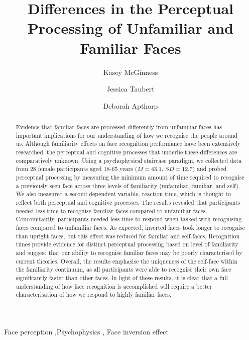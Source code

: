 \documentclass[
  authoryear,
  review,
  3p,
  onecolumn]{elsarticle}
\begin{document}
\begin{frontmatter}
\title{Differences in the Perceptual Processing of Unfamiliar and
Familiar Faces}
\author[1]{Kasey McGinness%
%
}

\author[2]{Jessica Taubert%
%
}

\author[1,3]{Deborah Apthorp%
%
}





        
\begin{abstract}
Evidence that familiar faces are processed differently from unfamiliar
faces has important implications for our understanding of how we
recognise the people around us. Although familiarity effects on face
recognition performance have been extensively researched, the perceptual
and cognitive processes that underlie these differences are
comparatively unknown. Using a psychophysical staircase paradigm, we
collected data from 28 female participants aged 18-65 years
(\(M = 43.1\), \(SD = 12.7\)) and probed perceptual processing by
measuring the minimum amount of time required to recognise a previously
seen face across three levels of familiarity (unfamiliar, familiar, and
self). We also measured a second dependent variable, reaction time,
which is thought to reflect both perceptual and cognitive processes. The
results revealed that participants needed less time to recognise
familiar faces compared to unfamiliar faces. Concomitantly, participants
needed less time to respond when tasked with recognising faces compared
to unfamiliar faces. As expected, inverted faces took longer to
recognise than upright faces, but this effect was reduced for familiar
and self-faces. Recognition times provide evidence for distinct
perceptual processing based on level of familiarity and suggest that our
ability to recognise familiar faces may be poorly characterised by
current theories. Overall, the results emphasise the uniqueness of the
self-face within the familiarity continuum, as all participants were
able to recognise their own face significantly faster than other faces.
In light of these results, it is clear that a full understanding of how
face recognition is accomplished will require a better characterisation
of how we respond to highly familiar faces.
\end{abstract}





\begin{keyword}
    Face perception \sep Psychophysics \sep 
    Face inversion effect
\end{keyword}
\end{frontmatter}
    
\end{document}
